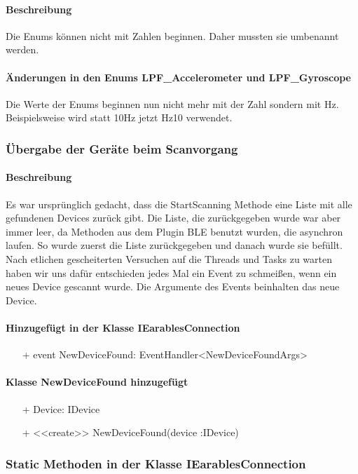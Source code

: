 \documentclass[a4paper,12pt]{article}
\begin{document}
\paragraph{Beschreibung}
Die Enums können nicht mit Zahlen beginnen. Daher mussten sie umbenannt werden.
\paragraph{Änderungen in den Enums LPF\_Accelerometer und LPF\_Gyroscope}
Die Werte der Enums beginnen nun nicht mehr mit der Zahl sondern mit Hz. \\
Beispielsweise wird statt 10Hz jetzt Hz10 verwendet.

\subsubsection{Übergabe der Geräte beim Scanvorgang}
\paragraph{Beschreibung}
Es war ursprünglich gedacht, dass die StartScanning Methode eine Liste mit alle gefundenen Devices zurück gibt. Die Liste, die zurückgegeben wurde war aber immer leer, da Methoden aus dem Plugin BLE benutzt wurden, die asynchron laufen. So wurde zuerst die Liste zurückgegeben und danach wurde sie befüllt. Nach etlichen gescheiterten Versuchen auf die Threads und Tasks zu warten haben wir uns dafür entschieden jedes Mal ein Event zu schmeißen, wenn ein neues Device gescannt wurde. Die Argumente des Events beinhalten das neue Device.
\paragraph{Hinzugefügt in der Klasse IEarablesConnection}
\begin{itemize}
	\item[+] event NewDeviceFound: EventHandler<NewDeviceFoundArgs> 
\end{itemize}
\paragraph{Klasse NewDeviceFound hinzugefügt}
\begin{itemize}
	\item[+] Device: IDevice
	\item[+] <<create>> NewDeviceFound(device :IDevice)
\end{itemize}

\subsubsection{Static Methoden in der Klasse IEarablesConnection}
\end{document}
